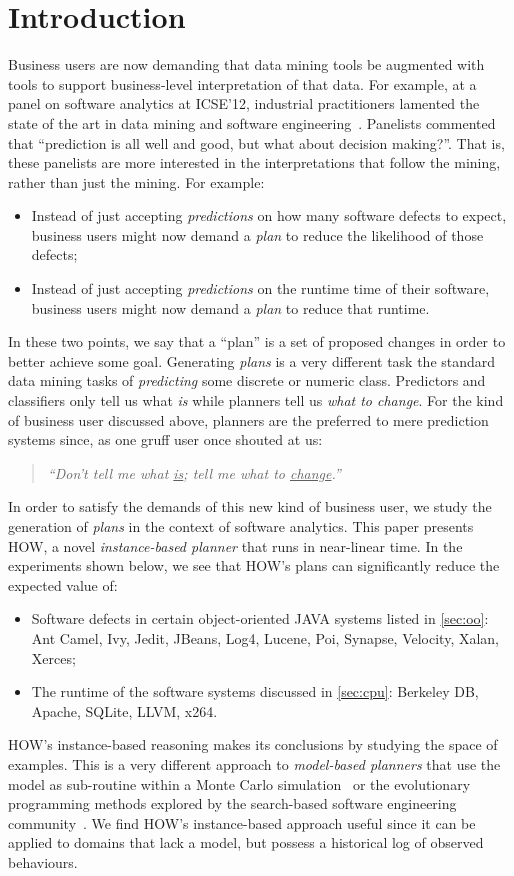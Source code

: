 \documentclass[conference]{IEEEtran}
\newcommand{\bi}{\begin{itemize}}
\newcommand{\ei}{\end{itemize}}
\newcommand{\tion}[1]{\textsection\ref{sec:#1}}
\begin{document}
\section{Introduction}
Business  users are now demanding that data mining tools
be augmented with tools to support  business-level
interpretation of that data. For example,
at a  panel on software analytics at ICSE'12,
industrial practitioners lamented the state of the art in data mining
and software engineering~\cite{menzies12a}. Panelists commented that
``prediction is all well and good, but what about decision
making?''. That is, these panelists are more interested in the interpretations
that follow the mining, rather than just  the mining. For example:
\bi
\item Instead of just accepting  {\em predictions} on how many 
 software defects
to expect,  business users might now demand a {\em plan} to
reduce the likelihood of those defects;
\item Instead of just accepting {\em predictions} on the runtime
time of their software, business users might now demand
a {\em plan} to reduce that runtime.
\ei
In these two points, we say that a ``plan'' is a  set of proposed changes in order to better achieve some goal. 
Generating {\em plans} is a  very different task the standard
data mining tasks of {\em predicting} some discrete or numeric class.
Predictors
and classifiers only tell us what {\em is} while planners 
  tell us {\em what to change}. For the kind of business user
discussed above, planners are the preferred to mere prediction systems
since, as one gruff user once shouted at us:
\begin{quote}
{\em ``Don't tell me what \underline{is};
tell me what to \underline{change}.''}
\end{quote}
In order to satisfy the demands of this new kind of business user, we  study the generation of {\em plans} in the context
of software analytics.  
This paper presents
HOW, a novel  {\em instance-based planner} that runs in near-linear time.
In the experiments shown below, we see that HOW's plans can
significantly reduce the expected
value of:
\bi
\item Software defects in certain object-oriented JAVA systems listed in \tion{oo}:  Ant Camel, Ivy, Jedit, JBeans, Log4, Lucene, Poi, Synapse, Velocity, Xalan, Xerces;
\item The runtime of the software systems discussed in \tion{cpu}: Berkeley DB, Apache, SQLite, LLVM, 
  x264.
\ei
HOW's instance-based reasoning  makes its conclusions by
studying the space of examples. This is a very different approach to
{\em model-based planners} that use the model
as sub-routine within a Monte Carlo simulation~\cite{me07f} or the evolutionary 
programming methods explored by the search-based software
engineering community~\cite{krall14,harman12dec}. 
We find   HOW's instance-based approach useful since it can be applied
to domains that lack a model, but possess a historical log of observed behaviours.
\end{document}
